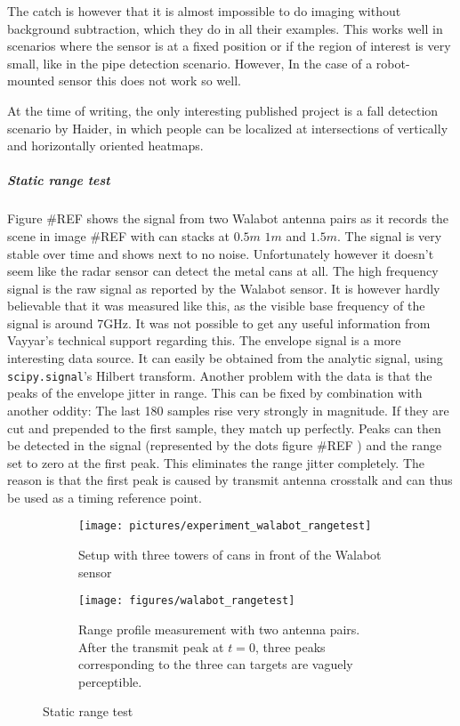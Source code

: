 The catch is however that it is almost impossible to do imaging without
background subtraction, which they do in all their examples. This works
well in scenarios where the sensor is at a fixed position or if the
region of interest is very small, like in the pipe detection scenario.
However, In the case of a robot-mounted sensor this does not work so
well.

At the time of writing, the only interesting published project is a fall
detection scenario \cite{Haider2017} by Haider, in which people can be
localized at intersections of vertically and horizontally oriented
heatmaps.

\subparagraph{Static range test}\label{static-range-test}

Figure \#REF shows the signal from two Walabot antenna pairs as it
records the scene in image \#REF with can stacks at \(0.5m\) \(1m\) and
\(1.5m\). The signal is very stable over time and shows next to no
noise. Unfortunately however it doesn't seem like the radar sensor can
detect the metal cans at all. The high frequency signal is the raw
signal as reported by the Walabot sensor. It is however hardly
believable that it was measured like this, as the visible base frequency
of the signal is around 7GHz. It was not possible to get any useful
information from Vayyar's technical support regarding this. The envelope
signal is a more interesting data source. It can easily be obtained from
the analytic signal, using \texttt{scipy.signal}'s Hilbert transform.
Another problem with the data is that the peaks of the envelope jitter
in range. This can be fixed by combination with another oddity: The last
180 samples rise very strongly in magnitude. If they are cut and
prepended to the first sample, they match up perfectly. Peaks can then
be detected in the signal (represented by the dots figure \#REF ) and
the range set to zero at the first peak. This eliminates the range
jitter completely. The reason is that the first peak is caused by
transmit antenna crosstalk and can thus be used as a timing reference
point.

\begin{figure}[htp]
    \centering
    \label{fig:walabot_rangetest}
    \begin{subfigure}{\textwidth}
        \centering
        \texttt{[image: pictures/experiment\_walabot\_rangetest]}
        \caption{Setup with three towers of cans in front of the Walabot sensor}
    \end{subfigure}
    \begin{subfigure}{\textwidth}
        \centering
        \texttt{[image: figures/walabot\_rangetest]}
        \caption{Range profile measurement with two antenna pairs. After the transmit peak at \(t=0\), three peaks corresponding to the three can targets are vaguely perceptible. }
    \end{subfigure}
    \caption{Static range test}
\end{figure}

